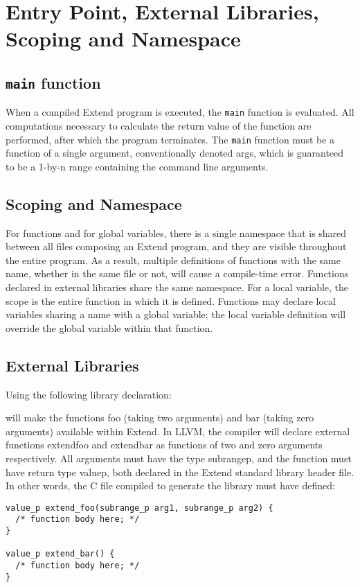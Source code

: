 \section{Entry Point, External Libraries, Scoping and Namespace}
\subsection{\texttt{main} function}
When a compiled Extend program is executed, the \texttt{main} function is evaluated. All computations necessary to calculate the return value of the function are performed, after which the program terminates. The \texttt{main} function must be a function of a single argument, conventionally denoted args, which is guaranteed to be a 1-by-n range containing the command line arguments.
\subsection{Scoping and Namespace}
For functions and for global variables, there is a single namespace that is shared between all files composing an Extend program, and they are visible throughout the entire program. As a result, multiple definitions of functions with the same name, whether in the same file or not, will cause a compile-time error. Functions declared in external libraries share the same namespace. For a local variable, the scope is the entire function in which it is defined. Functions may declare local variables sharing a name with a global variable; the local variable definition will override the global variable within that function.
\subsection{External Libraries}
\label{sec:ExternFunctionSignatures}
Using the following library declaration:

will make the functions foo (taking two arguments) and bar (taking zero arguments) available within Extend. In LLVM, the compiler will declare external functions extend\textunderscore foo and extend\textunderscore bar as functions of two and zero arguments respectively. All arguments must have the type subrange\textunderscore p, and the function must have return type value\textunderscore p, both declared in the Extend standard library header file. In other words, the C file compiled to generate the library must have defined:
\begin{lstlisting}
value_p extend_foo(subrange_p arg1, subrange_p arg2) {
  /* function body here; */
}

value_p extend_bar() {
  /* function body here; */
}
\end{lstlisting}
